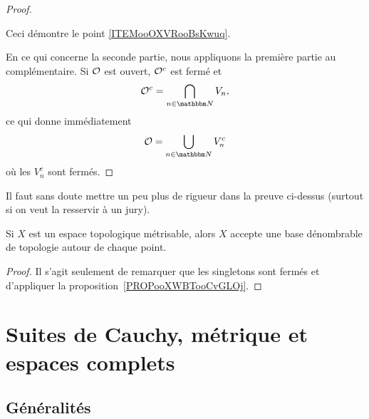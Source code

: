 \begin{proof}
\begin{subproof}
        \end{subproof}

        Ceci démontre le point \ref{ITEMooOXVRooBsKwuq}.

    En ce qui concerne la seconde partie, nous appliquons la première partie au complémentaire. Si \( \mathcal{O}\) est ouvert, \( \mathcal{O}^c\) est fermé et
    \begin{equation}
        \mO^c=\bigcap_{n\in \eN}V_n,
    \end{equation}
    ce qui donne immédiatement
    \begin{equation}
        \mO=\bigcup_{n\in \eN}V_n^c
    \end{equation}
    où les \( V_n^c\) sont fermés.
\end{proof}


\begin{probleme}
Il faut sans doute mettre un peu plus de rigueur dans la preuve ci-dessus (surtout si on veut la resservir à un jury).
\end{probleme}


\begin{corollary}       \label{CORooTWFYooCNMieM}
    Si \( X\) est un espace topologique métrisable, alors \( X\) accepte une base dénombrable de topologie autour de chaque point.
\end{corollary}

\begin{proof}
    Il s'agit seulement de remarquer que les singletons sont fermés et d'appliquer la proposition~\ref{PROPooXWBTooCvGLOj}.
\end{proof}

\section{Suites de Cauchy, métrique et espaces complets}

\subsection{Généralités}

